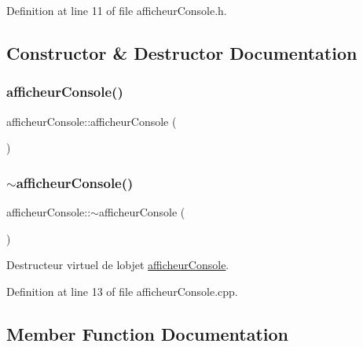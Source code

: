 Definition at line 11 of file afficheur\+Console.\+h.



\subsection{Constructor \& Destructor Documentation}
\hypertarget{classafficheur_console_a5d5b09077e150ddb11f0dc5b9cf89f6f}{}\label{classafficheur_console_a5d5b09077e150ddb11f0dc5b9cf89f6f} 
\subsubsection{\texorpdfstring{afficheur\+Console()}{afficheurConsole()}}
{\footnotesize\ttfamily afficheur\+Console\+::afficheur\+Console (\begin{DoxyParamCaption}{ }\end{DoxyParamCaption})\hspace{0.3cm}{\ttfamily [default]}}

\hypertarget{classafficheur_console_a0f902699d385726ea9d9889d37e57558}{}\label{classafficheur_console_a0f902699d385726ea9d9889d37e57558} 
\subsubsection{\texorpdfstring{$\sim$afficheur\+Console()}{~afficheurConsole()}}
{\footnotesize\ttfamily afficheur\+Console\+::$\sim$afficheur\+Console (\begin{DoxyParamCaption}{ }\end{DoxyParamCaption})\hspace{0.3cm}{\ttfamily [virtual]}}



Destructeur virtuel de l\textquotesingle{}objet \hyperlink{classafficheur_console}{afficheur\+Console}. 



Definition at line 13 of file afficheur\+Console.\+cpp.



\subsection{Member Function Documentation}
\hypertarget{classafficheur_console_aa77bdd8065edd5269f83679490e78dee}{}\label{classafficheur_console_aa77bdd8065edd5269f83679490e78dee} 
